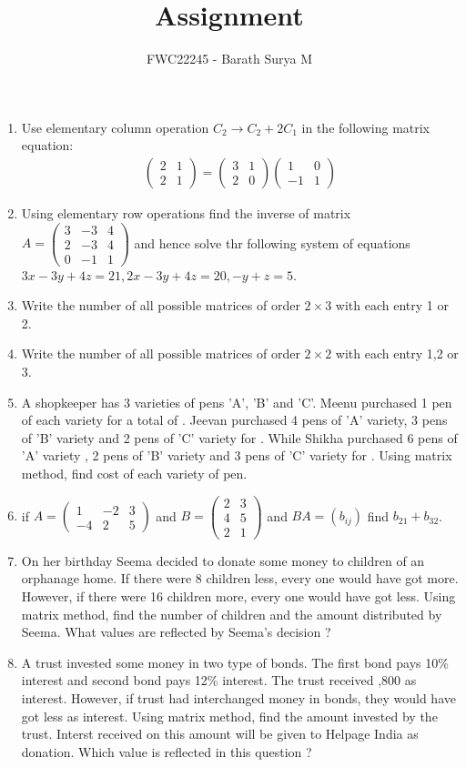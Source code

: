 \documentclass[12pt,-letter paper]{article}
\theoremstyle{remark}
\providecommand{\brak}[1]{\ensuremath{\left(#1\right)}}
\newcommand{\myvec}[1]{\ensuremath{\begin{pmatrix}#1\end{pmatrix}}}
\begin{document}
\vspace{3cm}

\title{Assignment}
\author{FWC22245 - Barath Surya M}
\maketitle
\begin{enumerate}
      \section{Matrices}
      \item Use elementary column operation $C_2 \rightarrow C_2 + 2C_1$ in the following matrix equation:
            \begin{align*}
                  \myvec{2 & 1 \\2&1} = \myvec{3&1 \\ 2&0} \myvec{1 & 0\\ -1 & 1}
            \end{align*}
      \item Using elementary row operations find the inverse of matrix $A =\myvec{3&-3&4\\2&-3&4\\0&-1&1}$ and hence solve thr following system of equations $3x-3y+4z=21,2x-3y+4z=20,-y+z=5$.
      \item Write the number of all possible matrices of order $2\times 3$ with each entry 1 or 2.
      \item Write the number of all possible matrices of order $2\times2$ with each entry 1,2 or 3.
      \item A shopkeeper has 3 varieties of pens 'A', 'B' and 'C'. Meenu purchased 1 pen of each variety for a total of . Jeevan purchased 4 pens of 'A' variety, 3 pens of 'B' variety and 2 pens of 'C' variety for . While Shikha purchased 6 pens of 'A' variety , 2 pens of 'B' variety and 3 pens of 'C' variety for . Using matrix method, find cost of each variety of pen.
      \item if $A=\myvec{1&-2&3\\-4&2&5}$ and $B=\myvec{2&3\\4&5\\2&1}$ and $BA=\brak{b_{ij}}$ find $b_{21} + b_{32}$.
      \item On her birthday Seema decided to donate some money to children of an orphanage home. If there were 8 children less, every one would have got  more. However, if there were 16 children more, every one would have got  less. Using matrix method, find the number of children and the amount distributed by Seema. What values are reflected by Seema's decision ?
      \item A trust invested some money in two type of bonds. The first bond pays 10\% interest and second bond pays 12\% interest. The trust received ,800 as interest. However, if trust had interchanged money in bonds, they would have got  less as interest. Using matrix method, find the amount invested by the trust. Interst received on this amount will be given to Helpage India as donation. Which value is reflected in this question ?

\end{enumerate}
\end{document}
